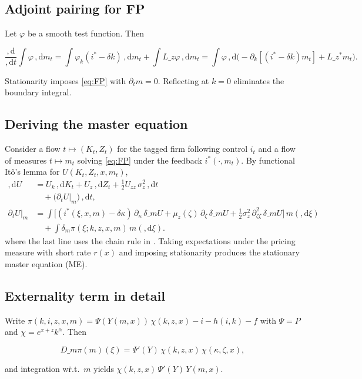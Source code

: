 \documentclass[11pt,letterpaper,oneside]{article}
\numberwithin{equation}{section}
\newcommand{\1}{\mathbf{1}}
\newcommand{\diff}{,\mathrm{d}}
\newcommand{\Lz}{L\_z}
\newcommand{\Lzadj}{L\_z^{\!*}}
\newcommand{\dmU}{\delta\_m U}
\newcommand{\Dm}{D\_m}
\begin{document}
\subsection{Adjoint pairing for FP}
Let $\varphi$ be a smooth test function. Then

$$
\frac{\diff}{\diff t}\int \varphi\,\diff m_t
= \int \varphi_k (i^*-\delta k)\,\diff m_t + \int \Lz \varphi\,\diff m_t
= \int \varphi\,\diff\Big(-\partial_k[(i^*-\delta k)m_t]+\Lzadj m_t\Big).
$$

Stationarity imposes \eqref{eq:FP} with $\partial_t m=0$. Reflecting at $k=0$ eliminates the boundary integral.

\subsection{Deriving the master equation}
Consider a flow $t\mapsto (K_t,Z_t)$ for the tagged firm following control $i_t$ and a flow of measures $t\mapsto m_t$ solving \eqref{eq:FP} under the feedback $i^*(\cdot,m_t)$. By functional Itô's lemma for $U(K_t,Z_t,x,m_t)$,
\begin{align*}
\diff U &= U_k\,\diff K_t + U_z\,\diff Z_t + \tfrac12 U_{zz}\,\sigma_z^2\,\diff t \\
        &\quad + \big(\partial_t U\big|_{m}\big)\,\diff t, \\
\partial_t U\big|_{m} &= \int \Big[ (i^*(\xi,x,m)-\delta\kappa)\,\partial_{\kappa}\,\dmU
  +\mu_z(\zeta)\,\partial_{\zeta}\,\dmU
  +\tfrac12\sigma_z^2\,\partial_{\zeta\zeta}^2\,\dmU\Big] \, m(\diff \xi) \\
  &\quad + \int \delta_m \pi(\xi; k,z,x,m) \, m(\diff \xi).
\end{align*}
  where the last line uses the chain rule in . Taking expectations under the pricing measure with short rate $r(x)$ and imposing stationarity produces the stationary master equation (ME).

\subsection{Externality term in detail}
Write $\pi(k,i,z,x,m)=\Psi(Y(m,x))\,\chi(k,z,x)-i-h(i,k)-f$ with $\Psi=P$ and $\chi=e^{x+z}k^\alpha$. Then

$$
\Dm\pi(m)(\xi)=\Psi'(Y)\,\chi(k,z,x)\,\chi(\kappa,\zeta,x),
$$

and integration w\.r.t.\ $m$ yields $\chi(k,z,x)\,\Psi'(Y)\,Y(m,x)$.
\end{document}
